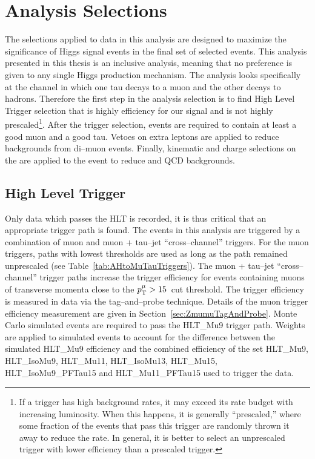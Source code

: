 \ifx\master\undefined\fi
%
\chapter{Analysis Selections} \label{ch:selections}
%
The selections applied to data in this analysis are designed to maximize the
significance of Higgs signal events in the final set of selected events.  This
analysis presented in this thesis is an inclusive analysis, meaning that no
preference is given to any single Higgs production mechanism.  The analysis
looks specifically at the channel in which one tau decays to a muon and the
other decays to hadrons.  Therefore the first step in the analysis selection is
to find High Level Trigger selection that is highly efficiency for our signal
and is not highly prescaled\footnote{If a trigger has high background rates, it
may exceed its rate budget with increasing luminosity.  When this happens, it is
generally ``prescaled,'' where some fraction of the events that pass this
trigger are randomly thrown it away to reduce the rate.  In general, it is
better to select an unprescaled trigger with lower efficiency than a prescaled
trigger.}.  After the trigger selection, events are required to contain at least
a good muon and a good tau.  Vetoes on extra leptons are applied to reduce
backgrounds from di--muon events.  Finally, kinematic and charge selections on
the are applied to the event to reduce \WpJets and QCD backgrounds.

\section{High Level Trigger}
Only data which passes the HLT is recorded, it is thus critical that an
appropriate trigger path is found. The events in this analysis are
triggered by a combination of muon and muon + tau--jet ``cross--channel''
triggers. For the muon triggers, paths with lowest \pt thresholds are used as
long as the path remained unprescaled (see Table~\ref{tab:AHtoMuTauTriggers}).
The muon + tau--jet ``cross--channel'' trigger paths increase the trigger
efficiency for events containing muons of transverse momenta close to the
$p_{\mathrm{T}}^{\mu} > 15$~\GeVc cut threshold.  The trigger efficiency is measured in
data via the tag--and--probe technique. Details of the muon trigger efficiency
measurement are given in Section~\ref{sec:ZmumuTagAndProbe}.  Monte Carlo
simulated events are required to pass the HLT\_Mu9 trigger path. Weights are
applied to simulated events to account for the difference between the simulated
HLT\_Mu9 efficiency and the combined efficiency of the set HLT\_Mu9,
HLT\_IsoMu9, HLT\_Mu11, HLT\_IsoMu13, HLT\_Mu15, HLT\_IsoMu9\_PFTau15 and
HLT\_Mu11\_PFTau15 used to trigger the data.

